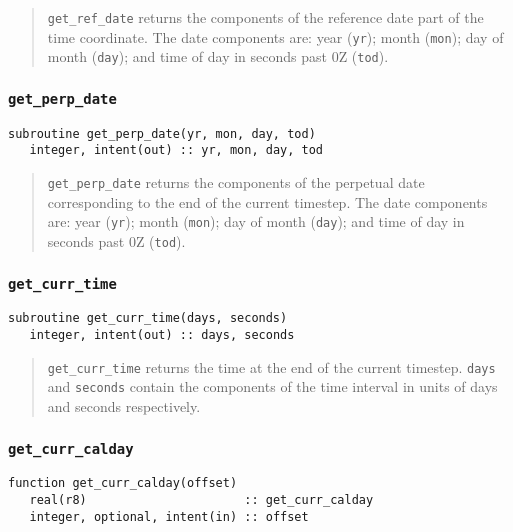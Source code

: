 \documentclass[12pt]{article}
\newcommand{\code}[1]{\texttt{#1}}
\begin{document}
\begin{quote}
\code{get\_ref\_date} returns the components of the reference date part of
the time coordinate.
The date components are: year (\code{yr}); month (\code{mon}); day of
month (\code{day}); and time of day in seconds past 0Z (\code{tod}).
\end{quote}

\subsubsection{\code{get\_perp\_date}}
\begin{verbatim}
subroutine get_perp_date(yr, mon, day, tod)
   integer, intent(out) :: yr, mon, day, tod
\end{verbatim}

\begin{quote}
\code{get\_perp\_date} returns the components of the perpetual date
corresponding to the end of the current timestep.
The date components are: year (\code{yr}); month (\code{mon}); day of
month (\code{day}); and time of day in seconds past 0Z (\code{tod}).
\end{quote}

\subsubsection{\code{get\_curr\_time}}
\begin{verbatim}
subroutine get_curr_time(days, seconds)
   integer, intent(out) :: days, seconds
\end{verbatim}

\begin{quote}
\code{get\_curr\_time} returns the time at the end of the current
timestep.  \code{days} and \code{seconds} contain the components of the time
interval in units of days and seconds respectively.
\end{quote}

\subsubsection{\code{get\_curr\_calday}}
\begin{verbatim}
function get_curr_calday(offset)
   real(r8)                      :: get_curr_calday
   integer, optional, intent(in) :: offset
\end{verbatim}
\end{document}
